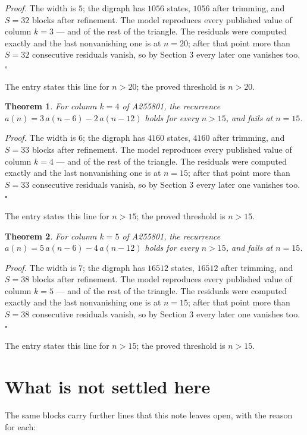 \documentclass[11pt]{article}
\newtheorem{theorem}{Theorem}
\theoremstyle{definition}
\begin{document}
{\itshape Proof.} The width is $5$; the digraph has $1056$ states, $1056$ after trimming, and $S = 32$ blocks after refinement. The model reproduces every published value of column $k = 3$ --- and of the rest of the triangle. The residuals were computed exactly and the last nonvanishing one is at $n = 20$; after that point more than $S = 32$ consecutive residuals vanish, so by Section 3 every later one vanishes too. $\square$

The entry states this line for $n > 20$; the proved threshold is $n > 20$.

\begin{theorem} For column $k = 4$ of A255801, the recurrence $a(n) = 3\,a(n-6) - 2\,a(n-12)$ holds for every $n > 15$, and fails at $n = 15$.\end{theorem}

{\itshape Proof.} The width is $6$; the digraph has $4160$ states, $4160$ after trimming, and $S = 33$ blocks after refinement. The model reproduces every published value of column $k = 4$ --- and of the rest of the triangle. The residuals were computed exactly and the last nonvanishing one is at $n = 15$; after that point more than $S = 33$ consecutive residuals vanish, so by Section 3 every later one vanishes too. $\square$

The entry states this line for $n > 15$; the proved threshold is $n > 15$.

\begin{theorem} For column $k = 5$ of A255801, the recurrence $a(n) = 5\,a(n-6) - 4\,a(n-12)$ holds for every $n > 15$, and fails at $n = 15$.\end{theorem}

{\itshape Proof.} The width is $7$; the digraph has $16512$ states, $16512$ after trimming, and $S = 38$ blocks after refinement. The model reproduces every published value of column $k = 5$ --- and of the rest of the triangle. The residuals were computed exactly and the last nonvanishing one is at $n = 15$; after that point more than $S = 38$ consecutive residuals vanish, so by Section 3 every later one vanishes too. $\square$

The entry states this line for $n > 15$; the proved threshold is $n > 15$.

\section{What is not settled here}

The same blocks carry further lines that this note leaves open, with the reason for each:
\end{document}
